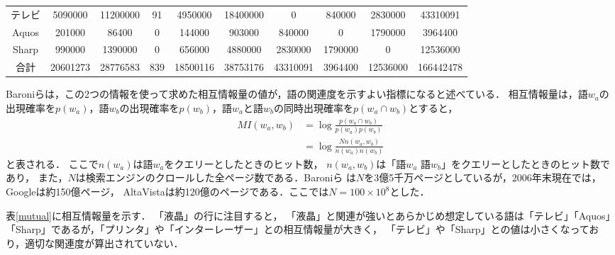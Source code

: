 \documentclass[japanese]{jnlp_1.3a}
\begin{document}
\begin{table}[b]
\begin{tabular}{c|cccccccc|c}
\\ 
テレビ  & 5090000  & 11200000  & 91  & 4950000  & 18400000  & 0  & 840000  & 2830000  & 43310091 
\\ 
Aquos  & 201000  & 86400  & 0  & 144000  & 903000  & 840000  & 0  & 1790000  & 3964400 
\\ 
Sharp  & 990000  & 1390000  & 0  & 656000  & 4880000  & 2830000  & 1790000  & 0  & 12536000 
\\ \hline
合計  & 20601273  & 28776583  & 839  & 18500116  & 38753176  & 43310091  & 3964400  & 12536000 & 166442478 \\ 
\end{tabular}
\end{table}

Baroniらは，この2つの情報を使って求めた相互情報量の値が，語の関連度を示すよい指標になると述べている．
相互情報量は，語$w_a$の出現確率を$p(w_a)$，語$w_b$の出現確率を$p(w_b)$，語$w_a$と語$w_b$の同時出現確率を$p(w_a \cap w_b)$とすると，
\pagebreak
\begin{align}
     \label{MI}
 MI(w_a,w_b) & = \log \frac{ p(w_a \cap w_b) }{p(w_a) p(w_b)}\\ \nonumber
      & = \log \frac{ N n(w_a,w_b)}{n(w_a) n(w_b)}
\end{align}
と表される．
ここで$n(w_a)$は語$w_a$をクエリーとしたときのヒット数，
$n(w_a ,w_b)$は「語$w_a$ 語$w_b$」をクエリーとしたときのヒット数であり，
また，$N$は検索エンジンのクロールした全ページ数である．Baroniら
は$N$を3億5千万ページとしているが，2006年末現在では，Googleは約150億ページ，
AltaVistaは約120億のページである．ここでは$N=100 \times 10^8$とした．


表\ref{mutual}に相互情報量を示す．
「液晶」の行に注目すると，
「液晶」と関連が強いとあらかじめ想定している語は「テレビ」「Aquos」「Sharp」であるが，「プリンタ」や「インターレーザー」との相互情報量が大きく，
「テレビ」や「Sharp」との値は小さくなっており，適切な関連度が算出されていない．
\end{document}
